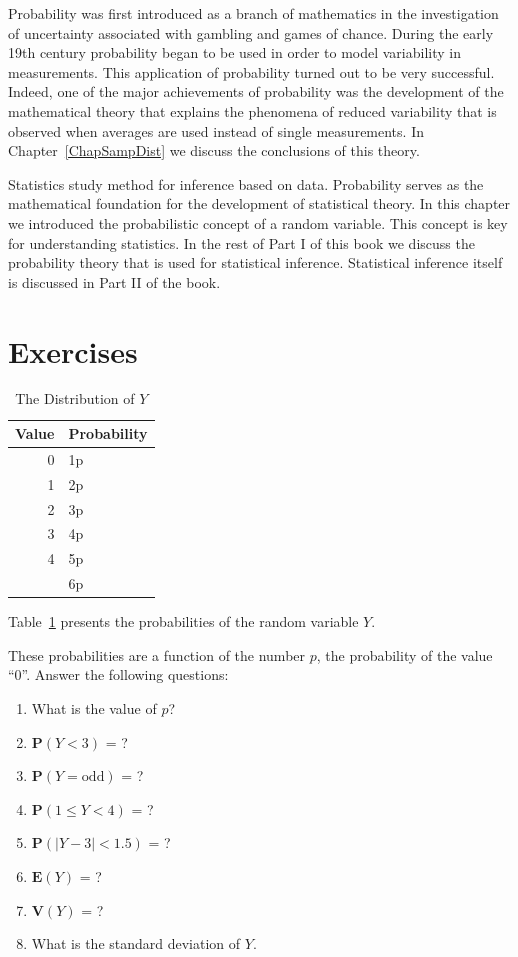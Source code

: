 \documentclass[]{krantz}
\newcommand{\Expec}{\mathbf{E}}
\newcommand{\Prob}{\mathbf{P}}
\newcommand{\Var}{\mathbf{V}}
\theoremstyle{definition}
\theoremstyle{definition}
\theoremstyle{definition}
\theoremstyle{remark}
\let\BeginKnitrBlock\begin \let\EndKnitrBlock\end
\begin{document}
Probability was first introduced as a branch of mathematics in the
investigation of uncertainty associated with gambling and games of
chance. During the early 19th century probability began to be used in
order to model variability in measurements. This application of
probability turned out to be very successful. Indeed, one of the major
achievements of probability was the development of the mathematical
theory that explains the phenomena of reduced variability that is
observed when averages are used instead of single measurements. In
Chapter~\ref{ChapSampDist} we discuss the conclusions of this theory.

Statistics study method for inference based on data. Probability serves
as the mathematical foundation for the development of statistical
theory. In this chapter we introduced the probabilistic concept of a
random variable. This concept is key for understanding statistics. In
the rest of Part I of this book we discuss the probability theory that
is used for statistical inference. Statistical inference itself is
discussed in Part II of the book.

\hypertarget{exercises-3}{%
\section{Exercises}\label{exercises-3}}

\begin{table}[t]

\caption{\label{tab:tab4}The Distribution of $Y$}
\centering
\begin{tabular}{rl}
\toprule
Value & Probability\\
\midrule
0 & 1p\\
1 & 2p\\
2 & 3p\\
3 & 4p\\
4 & 5p\\
\addlinespace
5 & 6p\\
\bottomrule
\end{tabular}
\end{table}

\BeginKnitrBlock{exercise}
\protect\hypertarget{exr:unnamed-chunk-50}{}{\label{exr:unnamed-chunk-50} }Table~\ref{tab:tab4} presents the
probabilities of the random variable \(Y\).

These probabilities are a
function of the number \(p\), the probability of the value ``0''. Answer the
following questions:

\begin{enumerate}
\def\labelenumi{\arabic{enumi}.}
\item
  What is the value of \(p\)?
\item
  \(\Prob(Y <3 )\) = ?
\item
  \(\Prob(Y = \mbox{odd})\) = ?
\item
  \(\Prob(1 \leq Y < 4)\) = ?
\item
  \(\Prob(|Y -3| < 1.5)\) = ?
\item
  \(\Expec(Y)\) = ?
\item
  \(\Var(Y)\) = ?
\item
  What is the standard deviation of \(Y\).
\end{enumerate}
\EndKnitrBlock{exercise}
\end{document}
